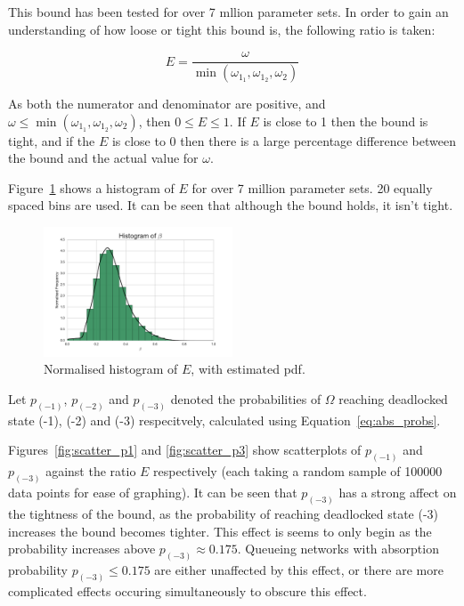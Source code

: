 \documentclass{article}
\numberwithin{equation}{section}
\begin{document}
This bound has been tested for over 7 mllion parameter sets.
In order to gain an understanding of how loose or tight this bound is, the following ratio is taken:

\begin{equation}
E = \frac{\omega}{\min(\omega_{1_1}, \omega_{1_2}, \omega_2)}
\end{equation}

As both the numerator and denominator are positive, and $\omega \leq \min(\omega_{1_1}, \omega_{1_2}, \omega_2)$, then $0 \leq E \leq 1$.
If $E$ is close to 1 then the bound is tight, and if the $E$ is close to 0 then there is a large percentage difference between the bound and the actual value for $\omega$.

Figure~\ref{fig:bound_ratio_hist} shows a histogram of $E$ for over 7 million parameter sets.
20 equally spaced bins are used.
It can be seen that although the bound holds, it isn't tight.

\begin{figure}[!htbp]
  \begin{center}
  \includegraphics[width=0.5\textwidth]{images/ratio_actual_bound}
  \end{center}
  \caption{Normalised histogram of $E$, with estimated pdf.}
  \label{fig:bound_ratio_hist}
\end{figure}


Let $p_{(-1)}$, $p_{(-2)}$ and $p_{(-3)}$ denoted the probabilities of $\Omega$ reaching deadlocked state (-1), (-2) and (-3) respecitvely, calculated using Equation~\ref{eq:abs_probs}.

Figures~\ref{fig:scatter_p1} and \ref{fig:scatter_p3} show scatterplots of $p_{(-1)}$ and $p_{(-3)}$ against the ratio $E$ respectively (each taking a random sample of 100000 data points for ease of graphing).
It can be seen that $p_{(-3)}$ has a strong affect on the tightness of the bound, as the probability of reaching deadlocked state (-3) increases the bound becomes tighter.
This effect is seems to only begin as the probability increases above $p_{(-3)} \approx 0.175$.
Queueing networks with absorption probability $p_{(-3)} \leq 0.175$ are either unaffected by this effect, or there are more complicated effects occuring simultaneously to obscure this effect.
\end{document}
